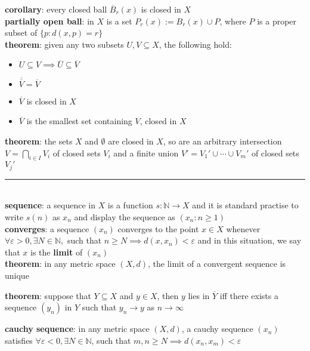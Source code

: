 \documentclass[a4paper]{article}
\newcommand*\closure[1]{\overline{#1}}
\newcommand*\linesep[0]{\noindent\rule{\textwidth}{0.5pt}\\}
\begin{document}
\begin{multicols}{2}
\begin{framed}
	\noindent
	\textbf{corollary}: every closed ball $\closure{B}_r(x)$ is closed in $X$\\
	
	\noindent
	\textbf{partially open ball}: in $X$ is a set $P_r(x) := B_r(x) \cup P$, where $P$ is a proper subset of $\{p : d(x, p) = r \}$\\
	
	\noindent
	\textbf{theorem}: given any two subsets $U, V \subseteq X$, the following hold:

		\begin{itemize}
			\item $U \subseteq V \implies \closure{U} \subseteq \closure{V}$
			\item $\closure{\closure{V}} = \closure{V}$
			\item $\closure{V}$ is closed in $X$
			\item $\closure{V}$ is the smallest set containing $V$, closed in $X$
		\end{itemize}	

	\end{framed}

	\begin{framed}
	\noindent
	\textbf{theorem}: the sets $X$ and $\emptyset$ are closed in $X$, so are an arbitrary intersection $V = \bigcap_{i \in I} V_i$ of closed sets $V_i$ and a finite union $V' = V_1' \cup \cdots \cup V_m'$ of closed sets $V_j'$
	
	\linesep
	\noindent
	\textbf{sequence}: a sequence in $X$ is a function $s: \mathbb{N} \rightarrow X$ and it is standard practise to write $s(n)$ as $x_n$ and display the sequence  as $(x_n : n \geq 1)$\\
	
	\noindent
	\textbf{converges}: a sequence $(x_n)$ converges to the point $x \in X$ whenever $\forall \varepsilon > 0, \exists N \in \mathbb{N},$ such that $n \geq N \implies d(x, x_n) < \varepsilon$ and in this situation, we say that $x$ is the \textbf{limit} of $(x_n)$\\
	
	\noindent
	\textbf{theorem}: in any metric space $(X, d)$, the limit of a convergent sequence is unique

	\noindent
	\textbf{theorem}: suppose that $Y \subseteq X$ and $y \in X$, then $y$ lies in $\closure{Y}$ iff there exists a sequence $(y_n)$ in $Y$ such that $y_n \rightarrow y$ as $n \rightarrow \infty$

	\noindent
	\textbf{cauchy sequence}: in any metric space $(X, d)$, a cauchy sequence $(x_n)$ satisfies $\forall \varepsilon < 0, \exists N \in \mathbb{N}$, such that $m, n \geq N \implies d(x_n, x_m) < \varepsilon$\\
	

\end{framed}
\end{multicols}
\end{document}
